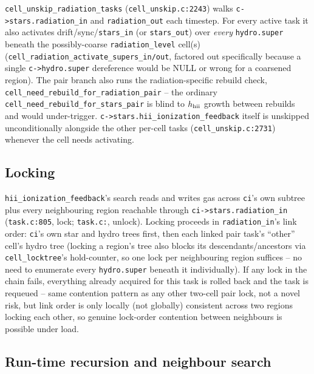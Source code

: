 \texttt{cell\_unskip\_radiation\_tasks} (\texttt{cell\_unskip.c:2243})
walks \texttt{c->stars.radiation\_in} and \texttt{radiation\_out}
each timestep. For every active task it also activates
drift/sync/\texttt{stars\_in} (or \texttt{stars\_out}) over
\emph{every} \texttt{hydro.super} beneath the possibly-coarse
\texttt{radiation\_level} cell(s)
(\texttt{cell\_radiation\_activate\_supers\_in/out}, factored out
specifically because a single \texttt{c->hydro.super} dereference
would be NULL or wrong for a coarsened region). The pair branch also
runs the radiation-specific rebuild check,
\texttt{cell\_need\_rebuild\_for\_radiation\_pair} -- the ordinary
\texttt{cell\_need\_rebuild\_for\_stars\_pair} is blind to $h_{\rm
hii}$ growth between rebuilds and would under-trigger.
\texttt{c->stars.hii\_ionization\_feedback} itself is unskipped
unconditionally alongside the other per-cell tasks
(\texttt{cell\_unskip.c:2731}) whenever the cell needs activating.

\subsection{Locking}

\texttt{hii\_ionization\_feedback}'s search reads and writes gas across
\texttt{ci}'s own subtree plus every neighbouring region reachable
through \texttt{ci->stars.radiation\_in} (\texttt{task.c:805}, lock;
\texttt{task.c:}, unlock). Locking proceeds in
\texttt{radiation\_in}'s link order: \texttt{ci}'s own star and hydro
trees first, then each linked pair task's ``other'' cell's hydro tree
(locking a region's tree also blocks its descendants/ancestors via
\texttt{cell\_locktree}'s hold-counter, so one lock per neighbouring
region suffices -- no need to enumerate every \texttt{hydro.super}
beneath it individually). If any lock in the chain fails, everything
already acquired for this task is rolled back and the task is
requeued -- same contention pattern as any other two-cell pair lock,
not a novel risk, but link order is only locally (not globally)
consistent across two regions locking each other, so genuine
lock-order contention between neighbours is possible under load.

\subsection{Run-time recursion and neighbour search}
\label{sec:runtime}


